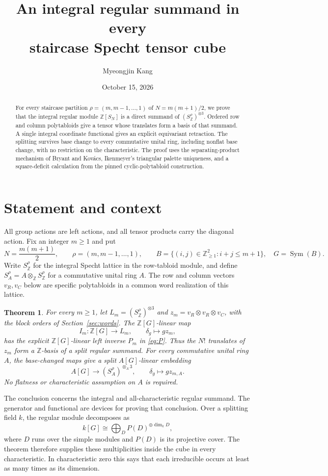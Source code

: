 \documentclass[11pt]{article}
\title{An integral regular summand in every\texorpdfstring{\\}{ }staircase Specht tensor cube}
\author{Myeongjin Kang}
\date{October 15, 2026}
\newcommand{\Z}{\mathbb Z}
\newcommand{\Sym}{\operatorname{Sym}}
\newtheorem{theorem}{Theorem}
\numberwithin{equation}{section}
\begin{document}
\maketitle
\begin{abstract}
For every staircase partition $\rho=(m,m-1,\ldots,1)$ of $N=m(m+1)/2$, we prove that the integral regular module $\Z[S_N]$ is a direct summand of $(S^\rho_{\Z})^{\otimes3}$. Ordered row and column polytabloids give a tensor whose translates form a basis of that summand. A single integral coordinate functional gives an explicit equivariant retraction. The splitting survives base change to every commutative unital ring, including nonflat base change, with no restriction on the characteristic. The proof uses the separating-product mechanism of Bryant and Kov\'acs, Ikenmeyer's triangular palette uniqueness, and a square-deficit calculation from the pinned cyclic-polytabloid construction.
\end{abstract}

\section{Statement and context}\label{sec:intro}
All group actions are left actions, and all tensor products carry the diagonal action. Fix an integer $m\ge1$ and put
\[
 N=\frac{m(m+1)}2,\qquad \rho=(m,m-1,\ldots,1),\qquad
 B=\{(i,j)\in\Z_{\ge1}^2:i+j\le m+1\},\quad G=\Sym(B).
\]
Write $S^\rho_{\Z}$ for the integral Specht lattice in the row-tabloid module, and define $S^\rho_A=A\otimes_{\Z}S^\rho_{\Z}$ for a commutative unital ring $A$. The row and column vectors $v_R,v_C$ below are specific polytabloids in a common word realization of this lattice.

\begin{theorem}\label{thm:main}
For every $m\ge1$, let $L_m=(S^\rho_{\Z})^{\otimes3}$ and $z_m=v_R\otimes v_R\otimes v_C$, with the block orders of Section~\ref{sec:words}. The $\Z[G]$-linear map
\[
 I_m:\Z[G]\longrightarrow L_m,\qquad \delta_g\longmapsto gz_m,
\]
has the explicit $\Z[G]$-linear left inverse $P_m$ in \eqref{eq:P}. Thus the $N!$ translates of $z_m$ form a $\Z$-basis of a split regular summand. For every commutative unital ring $A$, the base-changed maps give a split $A[G]$-linear embedding
\[
 A[G]\longrightarrow (S^\rho_A)^{\otimes_A3},\qquad \delta_g\longmapsto gz_{m,A}.
\]
No flatness or characteristic assumption on $A$ is required.
\end{theorem}

The conclusion concerns the integral and all-characteristic regular summand. The generator and functional are devices for proving that conclusion. Over a splitting field $k$, the regular module decomposes as
\[
 k[G]\cong\bigoplus_{D}P(D)^{\oplus\dim_kD},
\]
where $D$ runs over the simple modules and $P(D)$ is its projective cover. The theorem therefore supplies these multiplicities inside the cube in every characteristic. In characteristic zero this says that each irreducible occurs at least as many times as its dimension.
\end{document}
